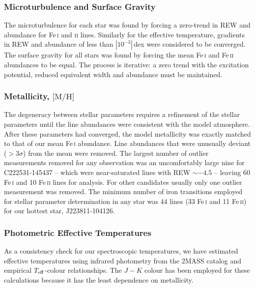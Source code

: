 \documentclass{emulateapj}
\begin{document}
\subsubsection{Microturbulence and Surface Gravity}
The microturbulence for each star was found by forcing a zero-trend in REW and abundance for Fe\,\textsc{i} and \textsc{ii} lines. Similarly for the effective temperature, gradients in REW and abundance of less than $|10^{-3}|$\,dex were considered to be converged. The surface gravity for all stars was found by forcing the mean Fe\,\textsc{i} and Fe\,\textsc{ii} abundances to be equal. The process is iterative: a zero trend with the excitation potential, reduced equivalent width and abundance must be maintained.

\subsubsection{Metallicity, $\mbox{[M/H]}$}
The degeneracy between stellar parameters requires a refinement of the stellar parameters until the line abundances were consistent with the model atmosphere. After these parameters had converged, the model metallicity was exactly matched to that of our mean Fe\,\textsc{i} abundance. Line abundances that were unusually deviant ($>$3$\sigma$) from the mean were removed. The largest number of outlier measurements removed for any observation was an uncomfortably large nine for C222531-145437 -- which were near-saturated lines with REW $\sim -4.5$ -- leaving 60 Fe\,\textsc{i} and 10 Fe\,\textsc{ii} lines for analysis. For other candidates usually only one outlier measurement was removed. The minimum number of iron transitions employed for stellar parameter determination in any star was 44 lines (33 Fe\,\textsc{i} and 11 Fe\,\textsc{ii}) for our hottest star, J223811-104126.

\subsubsection{Photometric Effective Temperatures}
\label{sec:photometric-temperatures}

As a consistency check for our spectroscopic temperatures, we have estimated effective temperatures using infrared photometry from the 2MASS \citep{skrutskie;et-al_2006} catalog and empirical $T_{\rm eff}$-colour relationships. The $J-K$ colour has been employed for these calculations because it has the least dependence on metallicity. 
\end{document}
